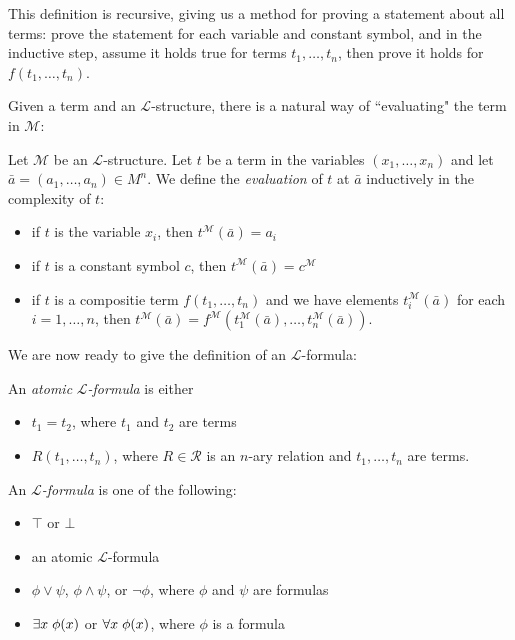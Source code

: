 This definition is recursive, giving us a method for proving a statement about all terms: prove the statement for each variable and constant symbol, and in the inductive step, assume it holds true for terms $t_1,\dots, t_n$, then prove it holds for $f(t_1,\dots, t_n)$.

Given a term and an $\mathcal{L}$-structure, there is a natural way of ``evaluating" the term in $\mathcal{M}$:

\begin{definition}
Let $\mathcal{M}$ be an $\mathcal{L}$-structure. Let $t$ be a term in the variables $(x_1,\dots, x_n)$ and let $\bar{a}=(a_1,\dots, a_n)\in M^n$. We define the \emph{evaluation} of $t$ at $\bar{a}$ inductively in the complexity of $t$:
\begin{itemize}
	\item if $t$ is the variable $x_i$, then $t^{\mathcal{M}}(\bar{a})=a_i$
	\item if $t$ is a constant symbol $c$, then $t^{\mathcal{M}}(\bar{a})=c^{\mathcal{M}}$
	\item if $t$ is a compositie term $f(t_1,\dots, t_n)$ and we have elements $t_i^{\mathcal{M}}(\bar{a})$ for each $i=1,\dots, n$, then $t^{\mathcal{M}}(\bar{a})=f^{\mathcal{M}}(t_1^{\mathcal{M}}(\bar{a}),\dots, t_n^{\mathcal{M}}(\bar{a}))$.
\end{itemize}
\end{definition}

We are now ready to give the definition of an $\mathcal{L}$-formula:

\begin{definition}
An \emph{atomic }$\mathcal{L}$\emph{-formula} is either
\begin{itemize}
	\item $t_1=t_2$, where $t_1$ and $t_2$ are terms
	\item $R(t_1,\dots, t_n)$, where $R\in\mathcal{R}$ is an $n$-ary relation and $t_1,\dots, t_n$ are terms.
\end{itemize}
An $\mathcal{L}$\emph{-formula} is one of the following:
\begin{itemize}
	\item $\top$ or $\bot$
	\item an atomic $\mathcal{L}$-formula
	\item $\phi\vee \psi$, $\phi\wedge \psi$, or $\neg\phi$, where $\phi$ and $\psi$ are formulas
	\item $\exists x \hspace{0.1cm}\phi(x)$ or $\forall x \hspace{0.1cm}\phi(x)$, where $\phi$ is a formula
\end{itemize}
\end{definition}

